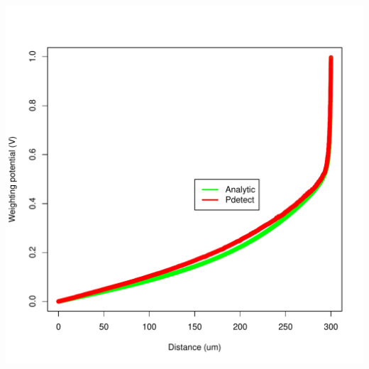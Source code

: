 \documentclass[14pt]{beamer}
\begin{document}
\begin{frame}
\begin{columns}
      \begin{column}{0.5\textwidth}
        \begin{center}
          \includegraphics[width=\textwidth]{images/edge-strip.pdf}
        \end{center}

      \end{column}
    \end{columns}

\end{frame}
\end{document}
